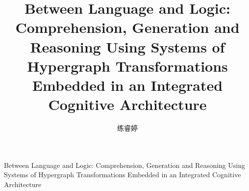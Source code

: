 \author{练睿婷}
\title{Between Language and Logic: Comprehension, Generation and Reasoning Using Systems of Hypergraph Transformations Embedded in an Integrated Cognitive Architecture}
{Between Language and Logic: Comprehension, Generation and Reasoning Using Systems of Hypergraph Transformations Embedded in an Integrated Cognitive Architecture}

